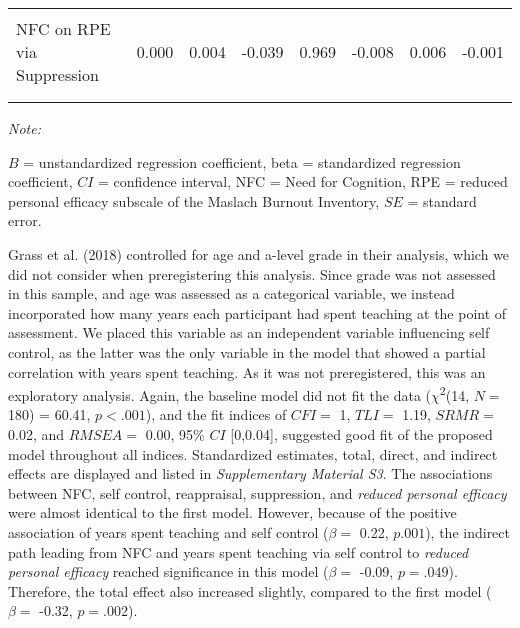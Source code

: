 \documentclass[
  english,
  man,floatsintext]{apa6}
\begin{document}
\begin{table}
{\begin{threeparttable}
\begin{tabular}[t]{lrrrrrrr}
\hspace{1em}\cellcolor{gray!6}{NFC on RPE via Reappraisal} & \cellcolor{gray!6}{-0.005} & \cellcolor{gray!6}{0.004} & \cellcolor{gray!6}{-1.429} & \cellcolor{gray!6}{0.153} & \cellcolor{gray!6}{-0.013} & \cellcolor{gray!6}{0.001} & \cellcolor{gray!6}{-0.021}\\
\hspace{1em}NFC on RPE via Suppression & 0.000 & 0.004 & -0.039 & 0.969 & -0.008 & 0.006 & -0.001\\
\addlinespace[0.3em]
\multicolumn{8}{l}{\textbf{Total Effect}}\\
\hspace{1em}\cellcolor{gray!6}{Total Effect} & \cellcolor{gray!6}{-0.067} & \cellcolor{gray!6}{0.023} & \cellcolor{gray!6}{-2.957} & \cellcolor{gray!6}{0.003} & \cellcolor{gray!6}{-0.111} & \cellcolor{gray!6}{-0.021} & \cellcolor{gray!6}{-0.276}\\
\bottomrule
\end{tabular}
\begin{tablenotes}
\item \textit{Note: } 
\item $B$ = unstandardized regression coefficient, beta = standardized regression coefficient, $CI$ = confidence interval, NFC = Need for Cognition, RPE = reduced personal efficacy subscale of the Maslach Burnout Inventory, $SE$ = standard error.
\end{tablenotes}
\end{threeparttable}}
\end{table}

Grass et al. (2018) controlled for age and a-level grade in their analysis, which we did not consider when preregistering this analysis.
Since grade was not assessed in this sample, and age was assessed as a categorical variable, we instead incorporated how many years each participant had spent teaching at the point of assessment.
We placed this variable as an independent variable influencing self control, as the latter was the only variable in the model that showed a partial correlation with years spent teaching.
As it was not preregistered, this was an exploratory analysis.
Again, the baseline model did not fit the data (\(\chi\)\textsuperscript{2}(14, \(N=\) 180) = 60.41, \(p < .001\)), and the fit indices of \(CFI=\) 1, \(TLI=\) 1.19, \(SRMR=\) 0.02, and \(RMSEA=\) 0.00, 95\% \(CI\) {[}0,0.04{]}, suggested good fit of the proposed model throughout all indices.
Standardized estimates, total, direct, and indirect effects are displayed and listed in \emph{Supplementary Material S3}.
The associations between NFC, self control, reappraisal, suppression, and \emph{reduced personal efficacy} were almost identical to the first model.
However, because of the positive association of years spent teaching and self control (\(\beta=\) 0.22, \(p.001\)), the indirect path leading from NFC and years spent teaching via self control to \emph{reduced personal efficacy} reached significance in this model (\(\beta=\) -0.09, \(p=.049\)).
Therefore, the total effect also increased slightly, compared to the first model (\(\beta=\) -0.32, \(p=.002\)).
\end{document}
